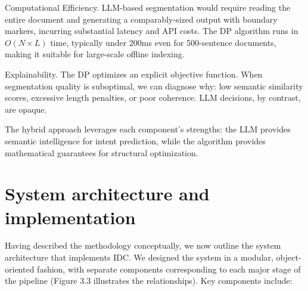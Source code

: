\documentclass[12pt,a4paper]{report}
\begin{document}
Computational Efficiency. LLM-based segmentation would require reading the entire document and generating a comparably-sized output with boundary markers, incurring substantial latency and API costs. The DP algorithm runs in $O(N \times L)$ time, typically under 200ms even for 500-sentence documents, making it suitable for large-scale offline indexing.

Explainability. The DP optimizes an explicit objective function. When segmentation quality is suboptimal, we can diagnose why: low semantic similarity scores, excessive length penalties, or poor coherence. LLM decisions, by contrast, are opaque.

The hybrid approach leverages each component's strengths: the LLM provides semantic intelligence for intent prediction, while the algorithm provides mathematical guarantees for structural optimization.

\section{System architecture and implementation}

Having described the methodology conceptually, we now outline the system architecture that implements IDC. We designed the system in a modular, object-oriented fashion, with separate components corresponding to each major stage of the pipeline (Figure 3.3 illustrates the relationships). Key components include:
\end{document}
